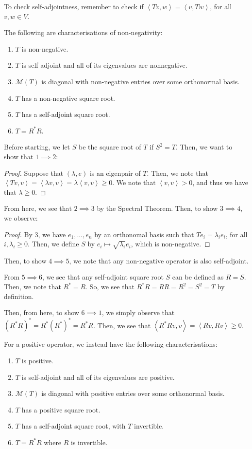 \documentclass[openany]{book}
\newcommand{\innerproduct}[2]{\left\langle{#1}, {#2}\right\rangle}
\begin{document}
\begin{rmk}
	To check self-adjointness, remember to check if $\innerproduct{Tv}{w} = \innerproduct{v}{Tw}$, for all $v, w \in V$.
\end{rmk}

The following are characterisations of non-negativity:
\begin{enumerate}
	\item $T$ is non-negative.
	\item $T$ is self-adjoint and all of its eigenvalues are nonnegative.
	\item $\mathcal M(T)$ is diagonal with non-negative entries over some orthonormal basis.
	\item $T$ has a non-negative square root.
	\item $T$ has a self-adjoint square root.
	\item $T = R^{*}R$. 
\end{enumerate}

Before starting, we let $S$ be the square root of $T$ if $S^{2} = T$. Then, we want to show that $1 \implies 2$:
\begin{proof}
	Suppose that $(\lambda, e)$ is an eigenpair of $T$. Then, we note that $\innerproduct{Tv}{v} = \innerproduct{\lambda v}{v} = \lambda \innerproduct{v}{v} \geq 0$. We note that $\innerproduct{v}{v} > 0$, and thus we have that $\lambda \geq 0$.
\end{proof}

From here, we see that $2 \implies 3$ by the Spectral Theorem. Then, to show $3 \implies 4$, we observe:
\begin{proof}
	By $3$, we have $e_{1}, \ldots, e_{n}$ by an orthonomal basis such that $Te_{i} = \lambda_{i} e_{i}$, for all $i, \lambda_i \geq 0$. Then, we define $S$ by $e_{i} \mapsto \sqrt{\lambda_i}e_{i}$, which is non-negative.  
\end{proof}

Then, to show $4 \implies 5$, we note that any non-negative operator is also self-adjoint.

From $5 \implies 6$, we see that any self-adjoint square root $S$ can be defined as $R = S$. Then, we note that $R^{*} = R$. So, we see that $R^{*}R = RR = R^{2} = S^{2} = T$ by definition.

Then, from here, to show $6 \implies 1$, we simply observe that $(R^{*}R)^{*} = R^{*}(R^{*})^{*} = R^{*}R$. Then, we see that $\innerproduct{R^{*}Rv}{v} = \innerproduct{Rv}{Rv} \geq 0$.

For a positive operator, we instead have the following characterisations:
\begin{enumerate}
	\item $T$ is positive.
	\item $T$ is self-adjoint and all of its eigenvalues are positive.
	\item $\mathcal M(T)$ is diagonal with positive entries over some orthonormal basis.
	\item $T$ has a positive square root.
	\item $T$ has a self-adjoint square root, with $T$ invertible.
	\item $T = R^{*}R$ where $R$ is invertible. 
\end{enumerate}
\end{document}
